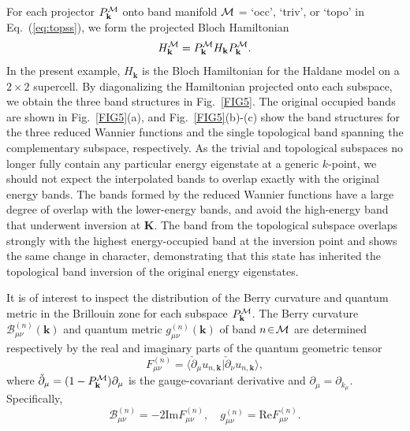 \documentclass[galley,aps,pra,10pt,amsmath,amssymb,
    superscriptaddress,nofootinbib,longbibliography]{revtex4-2}
\newcounter{comm}
\newcommand{\eq}[1]{Eq.~(\ref{eq:#1})}
\begin{document}
\def\ssp{{\cal M}} 
For each projector $P_{\mathbf{k}}^\ssp$ onto band manifold $\ssp$ = `occ', `triv', or `topo' in \eq{topss}, we form the projected Bloch Hamiltonian
\begin{equation}
H^\ssp_{\mathbf{k}} = P^\ssp_{\mathbf{k}} H_{\mathbf{k}} P^\ssp_{\mathbf{k}}.
\end{equation}
In the present example, $H_{\mathbf{k}}$ is the Bloch Hamiltonian for the Haldane model on a $2\times 2$ supercell. By diagonalizing the Hamiltonian projected onto each subspace, we obtain the three band structures in Fig.~\ref{FIG5}. The original occupied bands are shown in Fig.~\ref{FIG5}(a), and Fig.~\ref{FIG5}(b)-(c) show the band structures for the three reduced Wannier functions and the single topological band spanning the complementary subspace, respectively. As the trivial and topological subspaces no longer fully contain any particular energy eigenstate at a generic $k$-point, we should not expect the interpolated bands to overlap exactly with the original energy bands. The bands formed by the reduced Wannier functions have a large degree of overlap with the lower-energy bands, and avoid the high-energy band that underwent inversion at $\mathbf{K}$. The band from the topological subspace overlaps strongly with the highest energy-occupied band at the inversion point and shows the same change in character, demonstrating that this state has inherited the topological band inversion of the original energy eigenstates.  


It is of interest to inspect the distribution of the Berry curvature and quantum metric in the Brillouin zone for each subspace $P_{\mathbf{k}}^\ssp$. The Berry curvature $\mathcal{B}^{(n)}_{\mu\nu}(\mathbf{k})$ and quantum metric $g^{(n)}_{\mu\nu}(\mathbf{k})$ of band $n\!\in\!\ssp$ are determined respectively by the real and imaginary parts of the quantum geometric tensor \cite{marzari1997, study1905, PATI1991105}
\begin{equation}
    F_{\mu \nu}^{(n)} = \langle \check{\partial}_{\mu} u_{n, \mathbf{k}}| \check{\partial}_{\nu} u_{n, \mathbf{k}} \rangle ,
\end{equation}
where $\check{\partial}_{\mu} = (1-P_{\mathbf{k}}^\ssp)\partial_{\mu}$ is the gauge-covariant derivative and $\partial_{\mu} = \partial_{k_{\mu}}$. Specifically,
\begin{equation}
    \mathcal{B}_{\mu\nu}^{(n)} = -2 \text{Im}F_{\mu \nu}^{(n)}, \quad
    g_{\mu\nu}^{(n)} = \text{Re}F_{\mu\nu}^{(n)} .
\end{equation}
\end{document}
